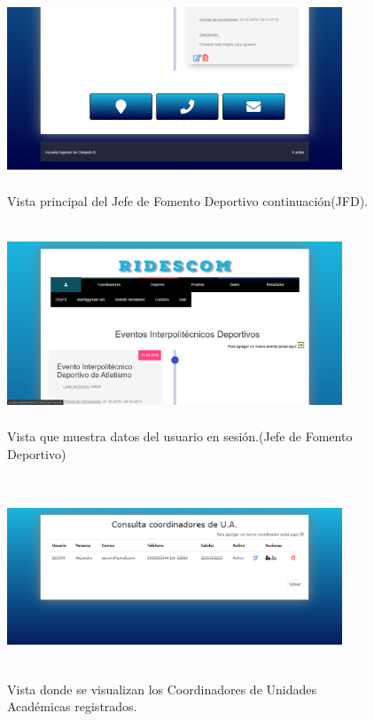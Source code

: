 		\begin{figure} [hbt!]
			\centering
			\includegraphics[width=10cm, height=6cm]{Imagenes/Vistas/Vista4_PrincipalJFD}
			\caption{Vista principal del Jefe de Fomento Deportivo continuación(JFD).}
			\label{VIstaPrincipalJFD1}
		\end{figure}
	
		\begin{figure} [hbt!]
			\centering
			\includegraphics[width=10cm, height=6cm]{Imagenes/Vistas/Vista5_MenuUsuarioJFD}
			\caption{Vista que muestra datos del usuario en sesión.(Jefe de Fomento Deportivo)}
			\label{VistaMenuUsuario}
		\end{figure}
		
		\begin{figure} [hbt!]
			\centering
			\includegraphics[width=10cm, height=6cm]{Imagenes/Vistas/Vista6_ConsultaCoordJFD}
			\caption{Vista donde se visualizan los Coordinadores de Unidades Académicas registrados.}
			\label{VistaConsultaCoord}
		\end{figure}
		

